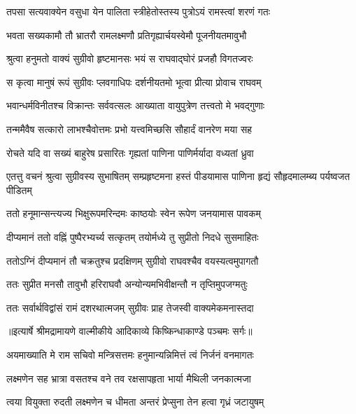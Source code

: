\twolineshloka
{तपसा सत्यवाक्येन वसुधा येन पालिता}
{स्त्रीहेतोस्तस्य पुत्रोऽयं रामस्त्वां शरणं गतः} %

\twolineshloka
{भवता सख्यकामौ तौ भ्रातरौ रामलक्ष्मणौ}
{प्रतिगृह्यार्चयस्वेमौ पूजनीयतमावुभौ} %

\twolineshloka
{श्रुत्वा हनुमतो वाक्यं सुग्रीवो हृष्टमानसः}
{भयं स राघवाद्घोरं प्रजहौ विगतज्वरः} %

\twolineshloka
{स कृत्वा मानुषं रूपं सुग्रीवः प्लवगाधिपः}
{दर्शनीयतमो भूत्वा प्रीत्या प्रोवाच राघवम्} %

\twolineshloka
{भवान्धर्मविनीतश्च विक्रान्तः सर्ववत्सलः}
{आख्याता वायुपुत्रेण तत्त्वतो मे भवद्गुणाः} %

\twolineshloka
{तन्ममैवैष सत्कारो लाभश्चैवोत्तमः प्रभो}
{यत्त्वमिच्छसि सौहार्दं वानरेण मया सह} %

\twolineshloka
{रोचते यदि वा सख्यं बाहुरेष प्रसारितः}
{गृह्यतां पाणिना पाणिर्मर्यादा वध्यतां ध्रुवा} %

\threelineshloka
{एतत्तु वचनं श्रुत्वा सुग्रीवस्य सुभाषितम्}
{सम्प्रहृष्टमना हस्तं पीडयामास पाणिना}
{हृद्यं सौहृदमालम्ब्य पर्यष्वजत पीडितम्} %

\twolineshloka
{ततो हनूमान्सन्त्यज्य भिक्षुरूपमरिन्दमः}
{काष्ठयोः स्वेन रूपेण जनयामास पावकम्} %

\twolineshloka
{दीप्यमानं ततो वह्निं पुष्पैरभ्यर्च्य सत्कृतम्}
{तयोर्मध्ये तु सुप्रीतो निदधे सुसमाहितः} %

\twolineshloka
{ततोऽग्निं दीप्यमानं तौ चक्रतुश्च प्रदक्षिणम्}
{सुग्रीवो राघवश्चैव वयस्यत्वमुपागतौ} %

\twolineshloka
{ततः सुप्रीत मनसौ तावुभौ हरिराघवौ}
{अन्योन्यमभिवीक्षन्तौ न तृप्तिमुपजग्मतुः} %

\twolineshloka
{ततः सर्वार्थविद्वांसं रामं दशरथात्मजम्}
{सुग्रीवः प्राह तेजस्वी वाक्यमेकमनास्तदा} %


{॥इत्यार्षे श्रीमद्रामायणे वाल्मीकीये आदिकाव्ये किष्किन्धाकाण्डे पञ्चमः सर्गः॥}


\twolineshloka
{अयमाख्याति मे राम सचिवो मन्त्रिसत्तमः}
{हनुमान्यन्निमित्तं त्वं निर्जनं वनमागतः} %

\twolineshloka
{लक्ष्मणेन सह भ्रात्रा वसतश्च वने तव}
{रक्षसापहृता भार्या मैथिली जनकात्मजा} %

\twolineshloka
{त्वया वियुक्ता रुदती लक्ष्मणेन च धीमता}
{अन्तरं प्रेप्सुना तेन हत्वा गृध्रं जटायुषम्} %

